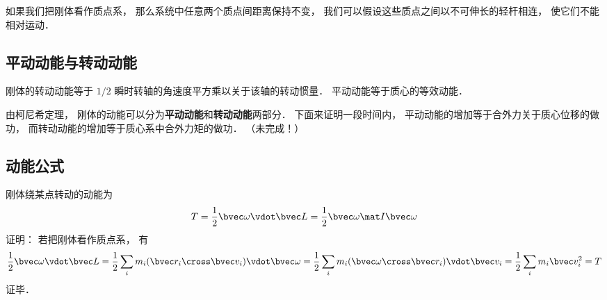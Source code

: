 
\begin{issues}
\issueDraft
\end{issues}


如果我们把刚体看作质点系， 那么系统中任意两个质点间距离保持不变， 我们可以假设这些质点之间以不可伸长的轻杆相连， 使它们不能相对运动．

\subsection{平动动能与转动动能}

刚体的转动动能等于 $1/2$ 瞬时转轴的角速度平方乘以关于该轴的转动惯量． 平动动能等于质心的等效动能．

由柯尼希定理， 刚体的动能可以分为\textbf{平动动能}和\textbf{转动动能}两部分． 下面来证明一段时间内， 平动动能的增加等于合外力关于质心位移的做功， 而转动动能的增加等于质心系中合外力矩的做功．
（未完成！）



\subsection{动能公式}
刚体绕某点转动的动能为
\begin{equation}
T = \frac{1}{2}\bvec \omega \vdot \bvec L = \frac{1}{2}\bvec \omega \mat I \bvec\omega
\end{equation}
证明： 若把刚体看作质点系， 有
\begin{equation}
\frac{1}{2}\bvec \omega \vdot \bvec L = \frac{1}{2} \sum_i m_i (\bvec r_i\cross \bvec v_i)\vdot \bvec \omega = \frac{1}{2} \sum_i m_i (\bvec \omega \cross \bvec r_i)\vdot \bvec v_i = \frac{1}{2} \sum_i m_i \bvec v_i^2 = T
\end{equation}
证毕．

